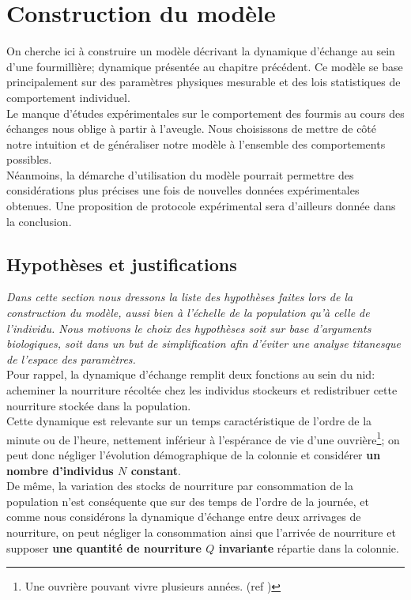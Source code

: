 \chapter{Construction du modèle}

On cherche ici à construire un modèle décrivant la dynamique d'échange au sein d'une fourmillière; dynamique présentée au chapitre précédent. Ce modèle se base principalement sur des paramètres physiques mesurable et des lois statistiques de comportement individuel. \\

Le manque d'études expérimentales sur le comportement des fourmis au cours des échanges nous oblige à partir à l'aveugle. Nous choisissons de mettre de côté notre intuition et de généraliser notre modèle à l'ensemble des comportements possibles.\\

Néanmoins, la démarche d'utilisation du modèle pourrait permettre des considérations plus précises une fois de nouvelles données expérimentales obtenues. Une proposition de protocole expérimental sera d'ailleurs donnée dans la conclusion.


\section{Hypothèses et justifications}
\textit{Dans cette section nous dressons la liste des hypothèses faites lors de la construction du modèle, aussi bien à l'échelle de la population qu'à celle de l'individu. Nous motivons le choix des hypothèses soit sur base d'arguments biologiques, soit dans un but de simplification afin d'éviter une analyse titanesque de l'espace des paramètres.}\\

Pour rappel, la dynamique d'échange remplit deux fonctions au sein du nid: acheminer la nourriture récoltée chez les individus stockeurs et redistribuer cette nourriture stockée dans la population. \\

Cette dynamique est relevante sur un temps caractéristique de l'ordre de la minute ou de l'heure, nettement inférieur à l'espérance de vie d'une ouvrière\footnote{Une ouvrière pouvant vivre plusieurs années. (ref \fixme)}; on peut donc négliger l'évolution démographique de la colonnie et considérer \textbf{un nombre d'individus $N$ constant}.\\

De même, la variation des stocks de nourriture par consommation de la population n'est conséquente que sur des temps de l'ordre de la journée, et comme nous considérons la dynamique d'échange entre deux arrivages de nourriture, on peut négliger la consommation ainsi que l'arrivée de nourriture et supposer \textbf{une quantité de nourriture $Q$ invariante} répartie dans la colonnie.\\


